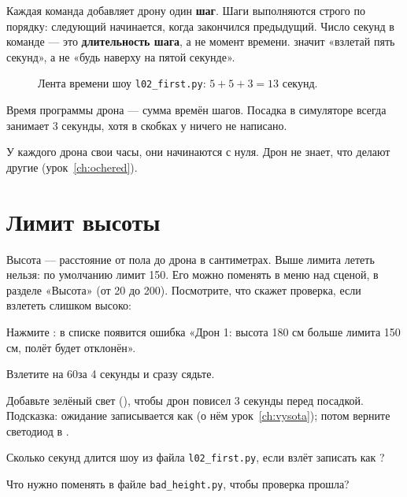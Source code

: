 Каждая команда добавляет дрону один \textbf{шаг}. Шаги выполняются строго по порядку: следующий начинается, когда закончился предыдущий. Число секунд в команде — это \textbf{длительность шага}, а не момент времени.  значит «взлетай пять секунд», а не «будь наверху на пятой секунде».

\begin{figure}[H]
  \centering
  
  \caption{Лента времени шоу \texttt{l02\_first.py}: $5 + 5 + 3 = 13$ секунд.}\label{fig:tl-first}
\end{figure}

Время программы дрона — сумма времён шагов. Посадка в симуляторе всегда занимает 3 секунды, хотя в скобках у  ничего не написано.

\begin{zametka}
У каждого дрона свои часы, они начинаются с нуля. Дрон не знает, что делают другие (урок~\ref{ch:ochered}).
\end{zametka}

\section{Лимит высоты}

Высота — расстояние от пола до дрона в сантиметрах. Выше лимита лететь нельзя: по умолчанию лимит 150\cm. Его можно поменять в меню  над сценой, в разделе «Высота» (от 20 до 200\cm). Посмотрите, что скажет проверка, если взлететь слишком высоко:


Нажмите : в списке появится ошибка «Дрон 1: высота 180 см больше лимита 150 см, полёт будет отклонён».

\begin{probuy}
  \item Взлетите на 60\cm за 4 секунды и сразу сядьте.
  \item Добавьте зелёный свет (), чтобы дрон повисел 3 секунды перед посадкой. Подсказка: ожидание записывается как  (о нём урок~\ref{ch:vysota}); потом верните светодиод в .
  \item Сколько секунд длится шоу из файла \texttt{l02\_first.py}, если взлёт записать как ?
  \item Что нужно поменять в файле \texttt{bad\_height.py}, чтобы проверка прошла?
\end{probuy}
